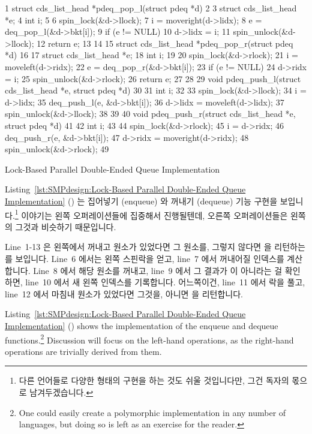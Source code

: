 \begin{listing*}[bp]
{ \scriptsize
\begin{verbbox}
  1 struct cds_list_head *pdeq_pop_l(struct pdeq *d)
  2 {
  3   struct cds_list_head *e;
  4   int i;
  5 
  6   spin_lock(&d->llock);
  7   i = moveright(d->lidx);
  8   e = deq_pop_l(&d->bkt[i]);
  9   if (e != NULL)
 10     d->lidx = i;
 11   spin_unlock(&d->llock);
 12   return e;
 13 }
 14 
 15 struct cds_list_head *pdeq_pop_r(struct pdeq *d)
 16 {
 17   struct cds_list_head *e;
 18   int i;
 19 
 20   spin_lock(&d->rlock);
 21   i = moveleft(d->ridx);
 22   e = deq_pop_r(&d->bkt[i]);
 23   if (e != NULL)
 24     d->ridx = i;
 25   spin_unlock(&d->rlock);
 26   return e;
 27 }
 28 
 29 void pdeq_push_l(struct cds_list_head *e, struct pdeq *d)
 30 {
 31   int i;
 32 
 33   spin_lock(&d->llock);
 34   i = d->lidx;
 35   deq_push_l(e, &d->bkt[i]);
 36   d->lidx = moveleft(d->lidx);
 37   spin_unlock(&d->llock);
 38 }
 39 
 40 void pdeq_push_r(struct cds_list_head *e, struct pdeq *d)
 41 {
 42   int i;
 43 
 44   spin_lock(&d->rlock);
 45   i = d->ridx;
 46   deq_push_r(e, &d->bkt[i]);
 47   d->ridx = moveright(d->ridx);
 48   spin_unlock(&d->rlock);
 49 }
\end{verbbox}
}
\centering
\theverbbox
\caption{Lock-Based Parallel Double-Ended Queue Implementation}
\label{lst:SMPdesign:Lock-Based Parallel Double-Ended Queue Implementation}
\end{listing*}

Listing~\ref{lst:SMPdesign:Lock-Based Parallel Double-Ended Queue Implementation}
() 
는 집어넣기 (enqueue) 와 꺼내기 (dequeue) 기능 구현을 보입니다.\footnote{
	다른 언어들로 다양한 형태의 구현을 하는 것도 쉬울 것입니다만, 그건
	독자의 몫으로 남겨두겠습니다.}
이야기는 왼쪽 오퍼레이션들에 집중해서 진행될텐데, 오른쪽 오퍼레이션들은 왼쪽의
그것과 비슷하기 때문입니다.

Line~1-13 은 왼쪽에서 꺼내고 원소가 있었다면 그 원소를, 그렇지 않다면 
을 리턴하는  를 보입니다.
Line~6 에서는 왼쪽 스핀락을 얻고, line~7 에서 꺼내어질 인덱스를 계산합니다.
Line~8 에서 해당 원소를 꺼내고, line~9 에서 그 결과가  이 아니라는 걸
확인하면, line~10 에서 새 왼쪽 인덱스를 기록합니다.
어느쪽이건, line~11 에서 락을 풀고, line~12 에서 마침내 원소가 있었다면 그것을,
아니면  을 리턴합니다.
\iffalse

Listing~\ref{lst:SMPdesign:Lock-Based Parallel Double-Ended Queue Implementation}
()
shows the implementation of the enqueue and dequeue functions.\footnote{
	One could easily create a polymorphic implementation in any
	number of languages, but doing so is left as an exercise for
	the reader.}
Discussion will focus on the left-hand operations, as the right-hand
operations are trivially derived from them.

